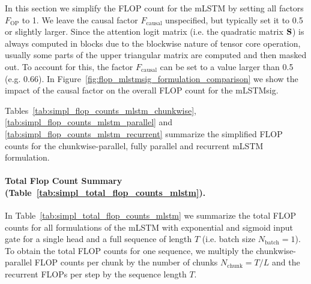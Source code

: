 \documentclass{article}
\begin{document}
    In this section we simplify the FLOP count for the mLSTM by setting all factors $F_\text{OP}$ to 1.
    We leave the causal factor $F_\text{causal}$ unspecified, but typically set it to 0.5 or slightly larger.
    Since the attention logit matrix (i.e. the quadratic matrix $\bm{\mathrm{S}}$) is always computed in blocks due to the blockwise nature of tensor core operation, usually some parts of the upper triangular matrix are computed and then masked out.
    To account for this, the factor $F_\text{causal}$ can be set to a value larger than 0.5 (e.g. 0.66).
    In Figure~\ref{fig:flop_mlstmsig_formulation_comparison} we show the impact of the causal factor on the overall FLOP count for the mLSTMsig.

    Tables~\ref{tab:simpl_flop_counts_mlstm_chunkwise}, \ref{tab:simpl_flop_counts_mlstm_parallel} and \ref{tab:simpl_flop_counts_mlstm_recurrent} summarize the simplified FLOP counts for the chunkwise-parallel, fully parallel and recurrent mLSTM formulation.

    \paragraph{Total Flop Count Summary (Table~\ref{tab:simpl_total_flop_counts_mlstm}).} In Table~\ref{tab:simpl_total_flop_counts_mlstm} we summarize the total FLOP counts for all formulations of the mLSTM with exponential and sigmoid input gate for a single head and a full sequence of length $T$ (i.e. batch size $N_\text{batch} = 1$).
    To obtain the total FLOP counts for one sequence, we multiply the chunkwise-parallel FLOP counts per chunk by the number of chunks $N_\text{chunk} = T / L$ and the recurrent FLOPs per step by the sequence length $T$.
\end{document}
